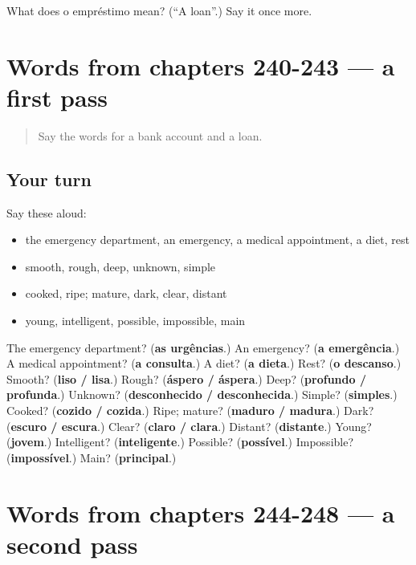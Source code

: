 \begin{tcolorbox}[breakable,colback=teal!4,colframe=teal!35!black,title={Before you move on}]
What does o empréstimo mean? (\textquotedblleft{}A loan\textquotedblright{}.) Say it once more.
\end{tcolorbox}
\section[(dialogue)]{Words from chapters 240-243 — a first pass}

\label{lesson:PT-R248-first-pass-words-from-chapters-240-243}



\begin{quote}
Say the words for a bank account and a loan.
\end{quote}

\subsection*{Your turn}
Say these aloud:

\begin{itemize}
\raggedright
  \item the emergency department, an emergency, a medical appointment, a diet, rest
  \item smooth, rough, deep, unknown, simple
  \item cooked, ripe; mature, dark, clear, distant
  \item young, intelligent, possible, impossible, main
\end{itemize}

\begin{tcolorbox}[breakable,colback=teal!4,colframe=teal!35!black,title={Before you move on}]
The emergency department? (\textbf{as urgências}.) An emergency? (\textbf{a emergência}.) A medical appointment? (\textbf{a consulta}.) A diet? (\textbf{a dieta}.) Rest? (\textbf{o descanso}.) Smooth? (\textbf{liso / lisa}.) Rough? (\textbf{áspero / áspera}.) Deep? (\textbf{profundo / profunda}.) Unknown? (\textbf{desconhecido / desconhecida}.) Simple? (\textbf{simples}.) Cooked? (\textbf{cozido / cozida}.) Ripe; mature? (\textbf{maduro / madura}.) Dark? (\textbf{escuro / escura}.) Clear? (\textbf{claro / clara}.) Distant? (\textbf{distante}.) Young? (\textbf{jovem}.) Intelligent? (\textbf{inteligente}.) Possible? (\textbf{possível}.) Impossible? (\textbf{impossível}.) Main? (\textbf{principal}.)
\end{tcolorbox}
\section[(dialogue)]{Words from chapters 244-248 — a second pass}

